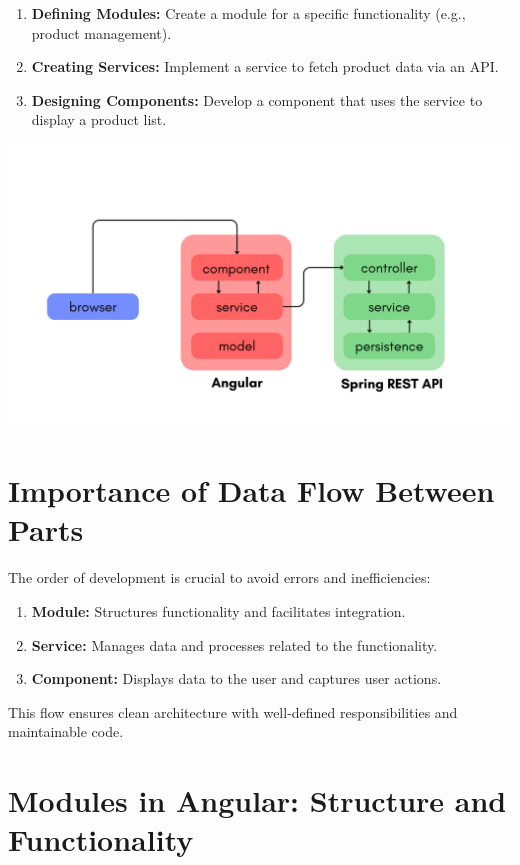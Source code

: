\documentclass{article}
\begin{document}
\begin{enumerate}
    \item \textbf{Defining Modules:}  
    Create a module for a specific functionality (e.g., product management).
    \item \textbf{Creating Services:}  
    Implement a service to fetch product data via an API.
    \item \textbf{Designing Components:}  
    Develop a component that uses the service to display a product list.
\end{enumerate}
\begin{tcolorbox}[colframe=black!70, colback=white, title=Figure 4: Data Flow, fonttitle=\bfseries]
\centering
\includegraphics[width=\textwidth]{images/angular_spring_diagram.png}
\end{tcolorbox}

\section{Importance of Data Flow Between Parts}

The order of development is crucial to avoid errors and inefficiencies:
\begin{enumerate}
    \item \textbf{Module:} Structures functionality and facilitates integration.
    \item \textbf{Service:} Manages data and processes related to the functionality.
    \item \textbf{Component:} Displays data to the user and captures user actions.
\end{enumerate}

This flow ensures clean architecture with well-defined responsibilities and maintainable code.
\section*{Modules in Angular: Structure and Functionality}
\end{document}
